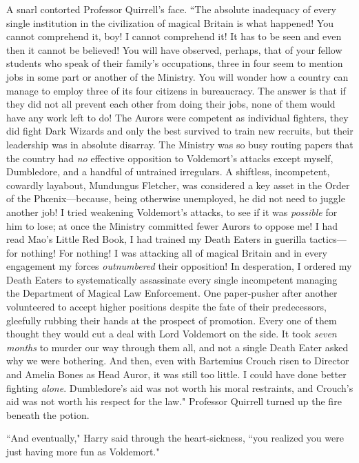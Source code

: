 A snarl contorted Professor Quirrell's face. ``The absolute inadequacy of every single institution in the civilization of magical Britain is what happened! You cannot comprehend it, boy! I cannot comprehend it! It has to be seen and even then it cannot be believed! You will have observed, perhaps, that of your fellow students who speak of their family's occupations, three in four seem to mention jobs in some part or another of the Ministry. You will wonder how a country can manage to employ three of its four citizens in bureaucracy. The answer is that if they did not all prevent each other from doing their jobs, none of them would have any work left to do! The Aurors were competent as individual fighters, they did fight Dark Wizards and only the best survived to train new recruits, but their leadership was in absolute disarray. The Ministry was so busy routing papers that the country had \emph{no} effective opposition to Voldemort's attacks except myself, Dumbledore, and a handful of untrained irregulars. A shiftless, incompetent, cowardly layabout, Mundungus Fletcher, was considered a key asset in the Order of the Phœnix—because, being otherwise unemployed, he did not need to juggle another job! I tried weakening Voldemort's attacks, to see if it was \emph{possible} for him to lose; at once the Ministry committed fewer Aurors to oppose me! I had read Mao's Little Red Book, I had trained my Death Eaters in guerilla tactics—for nothing! For nothing! I was attacking all of magical Britain and in every engagement my forces \emph{outnumbered} their opposition! In desperation, I ordered my Death Eaters to systematically assassinate every single incompetent managing the Department of Magical Law Enforcement. One paper-pusher after another volunteered to accept higher positions despite the fate of their predecessors, gleefully rubbing their hands at the prospect of promotion. Every one of them thought they would cut a deal with Lord Voldemort on the side. It took \emph{seven months} to murder our way through them all, and not a single Death Eater asked why we were bothering. And then, even with Bartemius Crouch risen to Director and Amelia Bones as Head Auror, it was still too little. I could have done better fighting \emph{alone}. Dumbledore's aid was not worth his moral restraints, and Crouch's aid was not worth his respect for the law." Professor Quirrell turned up the fire beneath the potion.

``And eventually," Harry said through the heart-sickness, ``you realized you were just having more fun as Voldemort."

